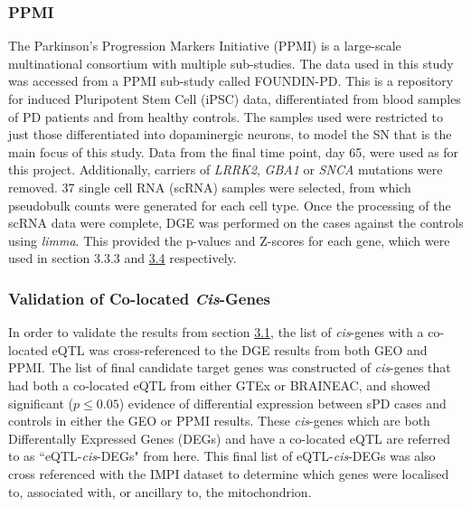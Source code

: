 \documentclass{article}
\begin{document}
\subsubsection{PPMI}
The Parkinson's Progression Markers Initiative (PPMI)\cite{Marek2011ThePPMI} is a large-scale multinational consortium with multiple sub-studies. The data used in this study was accessed from a PPMI sub-study called FOUNDIN-PD\cite{Bressan2023TheMechanism}. This is a repository for induced Pluripotent Stem Cell (iPSC) data, differentiated from blood samples of PD patients and from healthy controls. The samples used were restricted to just those differentiated into dopaminergic neurons, to model the SN that is the main focus of this study. Data from the final time point, day 65, were used as for this project. Additionally, carriers of \textit{LRRK2}, \textit{GBA1} or \textit{SNCA} mutations were removed. 37 single cell RNA (scRNA) samples were selected, from which pseudobulk counts were generated for each cell type. Once the processing of the scRNA data were complete, DGE was performed on the cases against the controls using \textit{limma}\cite{Ritchie2015LimmaStudies}. This provided the p-values and Z-scores for each gene, which were used in section 3.3.3 and \hyperref[subsec:pathways]{3.4} respectively.
\subsubsection{Validation of Co-located \textit{Cis}-Genes}
In order to validate the results from section \hyperref[subsec:eQTl]{3.1}, the list of \textit{cis}-genes with a co-located eQTL was cross-referenced to the DGE results from both GEO and PPMI. The list of final candidate target genes was constructed of \textit{cis}-genes that had both a co-located eQTL from either GTEx or BRAINEAC, and showed significant ($p\leq0.05$) evidence of differential expression between sPD cases and controls in either the GEO or PPMI results. These \textit{cis}-genes which are both Differentally Expressed Genes (DEGs) and have a co-located eQTL are referred to as ``eQTL-\textit{cis}-DEGs" from here. This final list of eQTL-\textit{cis}-DEGs was also cross referenced with the IMPI dataset\cite{Smith2016MitoMinerDatabase} to determine which genes were localised to, associated with, or ancillary to, the mitochondrion.
\end{document}
